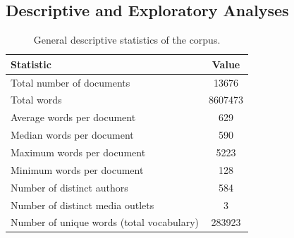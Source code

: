 \documentclass[11pt,a4paper]{article}
\begin{document}
	
	
\subsection{Descriptive and Exploratory Analyses}

	
	\begin{table}[H]
		\centering
		\caption{General descriptive statistics of the corpus.}
		\label{tab:estadisticos_generales}
		\begin{tabular}{l c}
			\hline
			\textbf{Statistic} & \textbf{Value} \\
			\hline
			Total number of documents & 13676\\
			Total words & 8607473\\
			Average words per document & 629\\
			Median words per document & 590\\
			Maximum words per document & 5223\\
			Minimum words per document & 128\\
			Number of distinct authors & 584\\
			Number of distinct media outlets & 3\\
			Number of unique words (total vocabulary) & 283923\\
			\hline
		\end{tabular}
	\end{table}
	
\end{document}
